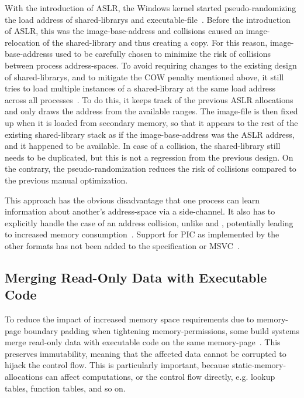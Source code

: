 With the introduction of \gls{ASLR}, the Windows kernel started pseudo-randomizing the load address of \glspl{shared-library} and \gls{executable-file}~\cite{ms-aslr}. Before the introduction of \gls{ASLR}, this was the \gls{image-base-address} and collisions caused an \gls{image-relocation} of the \gls{shared-library} and thus creating a copy. For this reason, \glspl{image-base-address} used to be carefully chosen to minimize the risk of collisions between process \glspl{address-space}. To avoid requiring changes to the existing design of \glspl{shared-library}, and to mitigate the \gls{COW} penalty mentioned above, it still tries to load multiple instances of a \gls{shared-library} at the same load address across all processes~\cite{ms-dll-base-addr}. To do this, it keeps track of the previous \gls{ASLR} allocations and only draws the address from the available ranges. The \gls{image-file} is then fixed up when it is loaded from secondary memory, so that it appears to the rest of the existing \gls{shared-library} stack as if the \gls{image-base-address} was the \gls{ASLR} address, and it happened to be available. In case of a collision, the \gls{shared-library} still needs to be duplicated, but this is not a regression from the previous design. On the contrary, the \gls{pseudo-randomization} reduces the risk of collisions compared to the previous manual optimization.

This approach has the obvious disadvantage that one process can learn information about another's \gls{address-space} via a \gls{side-channel}. It also has to explicitly handle the case of an address collision, unlike  and , potentially leading to increased memory consumption~\cite{ms-dll-base-addr}. Support for \gls{PIC} as implemented by the other formats has not been added to the  specification or \gls{MSVC}~\cite{pe-format}.

\subsection{Merging Read-Only Data with Executable Code}
\label{sec:merge_ro_x}

To reduce the impact of increased memory space requirements due to \gls{memory-page} boundary padding when tightening \glspl{memory-permission}, some build systems merge read-only data with executable code on the same \gls{memory-page}~\cite{macho-spec,edk2}. This preserves immutability, meaning that the affected data cannot be corrupted to hijack the control flow. This is particularly important, because \glspl{static-memory-allocation} can affect computations, or the control flow directly, e.g. lookup tables, function tables, and so on.

